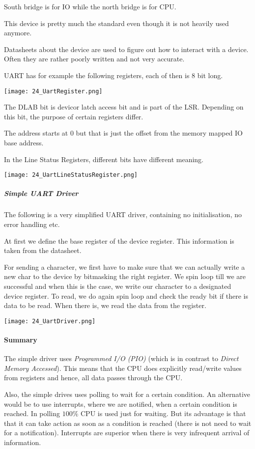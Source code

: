 South bridge is for IO while the north bridge is for CPU.

This device is pretty much the standard even though it is not heavily used anymore.

Datasheets about the device are used to figure out how to interact with a device. Often they are rather poorly written and not very accurate.

UART has for example the following registers, each of then is $8$ bit long.

\texttt{[image: 24\_UartRegister.png]}

The DLAB bit is devicor latch access bit and is part of the LSR. Depending on this bit, the purpose of certain registers differ.

The address starts at $0$ but that is just the offset from the memory mapped IO base address.

In the Line Status Registers, different bits have different meaning.

\texttt{[image: 24\_UartLineStatusRegister.png]}

\subparagraph{Simple UART Driver}
The following is a very simplified UART driver, containing no initialisation, no error handling etc.

At first we define the base register of the device register. This information is taken from the datasheet.

For sending a character, we first have to make sure that we can actually write a new char to the device by bitmasking the right register. We spin loop till we are successful and when this is the case, we write our character to a designated device register. To read, we do again spin loop and check the ready bit if there is data to be read. When there is, we read the data from the register.

\texttt{[image: 24\_UartDriver.png]}

\paragraph{Summary}
The simple driver uses \textit{Programmed I/O (PIO)} (which is in contrast to \textit{Direct Memory Accessed}). This means that the CPU does explicitly read/write values from registers and hence, all data passes through the CPU.

Also, the simple drives uses polling to wait for a certain condition. An alternative would be to use interrupts, where we are notified, when a certain condition is reached. In polling $100\%$ CPU is used just for waiting. But its advantage is that that it can take action as soon as a condition is reached (there is not need to wait for a notification). Interrupts are superior when there is very infrequent arrival of information.

